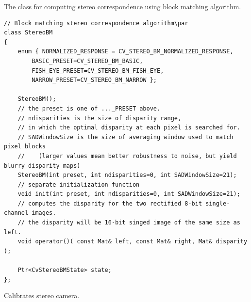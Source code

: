 The class for computing stereo correspondence using block matching algorithm.

\begin{lstlisting}
// Block matching stereo correspondence algorithm\par
class StereoBM
{
    enum { NORMALIZED_RESPONSE = CV_STEREO_BM_NORMALIZED_RESPONSE,
        BASIC_PRESET=CV_STEREO_BM_BASIC,
        FISH_EYE_PRESET=CV_STEREO_BM_FISH_EYE,
        NARROW_PRESET=CV_STEREO_BM_NARROW };

    StereoBM();
    // the preset is one of ..._PRESET above.
    // ndisparities is the size of disparity range,
    // in which the optimal disparity at each pixel is searched for.
    // SADWindowSize is the size of averaging window used to match pixel blocks
    //    (larger values mean better robustness to noise, but yield blurry disparity maps)
    StereoBM(int preset, int ndisparities=0, int SADWindowSize=21);
    // separate initialization function
    void init(int preset, int ndisparities=0, int SADWindowSize=21);
    // computes the disparity for the two rectified 8-bit single-channel images.
    // the disparity will be 16-bit singed image of the same size as left.
    void operator()( const Mat& left, const Mat& right, Mat& disparity );

    Ptr<CvStereoBMState> state;
};
\end{lstlisting}

\fi

Calibrates stereo camera.


